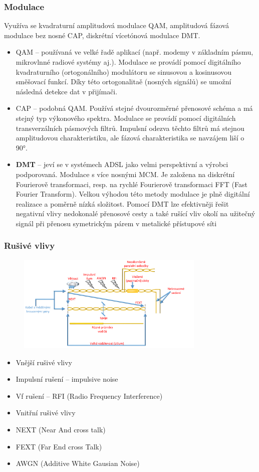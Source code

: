 \subsubsection{Modulace}
Využíva se kvadraturní amplitudová modulace QAM, amplitudová fázová modulace bez nosné CAP, diskrétní vícetónová modulace DMT.
\begin{itemize}
    \item QAM -- používaná ve velké řadě aplikací (např. modemy v základním pásmu, mikrovlnné radiové systémy aj.). Modulace se provádí pomocí digitálního kvadraturního (ortogonálního) modulátoru se sinusovou a kosinusovou směšovací funkcí. Díky této ortogonalitaě (nosných signálů) se umožní následná detekce dat v přijímači.
    \item CAP -- podobná QAM. Používá stejné dvourozměrné přenosové schéma a má stejný typ výkonového spektra. Modulace se provádí pomocí digitálních transverzálních pásmových filtrů. Impulsní odezva těchto filtrů má stejnou amplitudovou charakteristiku, ale fázová charakteristika se navzájem liší o 90°. 
    \item \textbf{DMT} -- jeví se v systémech ADSL jako velmi perspektivní a výrobci podporovaná. Modulace s více nosnými MCM. Je založena na diskrétní Fourierově transformaci, resp. na rychlé Fourierově transformaci FFT (Fast Fourier Transform). Velkou výhodou této metody modulace je plně digitální realizace a poměrně nízká složitost. Pomocí DMT lze efektivněji řešit negativní vlivy nedokonalé přenosové cesty a také rušící vliv okolí na užitečný signál při přenosu symetrickým párem v metalické přístupové síti
\end{itemize}

\subsubsection{Rušivé vlivy}
\begin{figure} [h]
    \centering
    \includegraphics[width=0.8\textwidth]{snimky/ADSL ruch.png}
    \label{fig:uml}
\end{figure}
\begin{itemize}
    \item Vnější rušivé vlivy
    \item Impulsní rušení – impulsive noise
    \item Vf rušení – RFI (Radio Frequency Interference)
    \item Vnitřní rušivé vlivy
    \item NEXT (Near And cross talk)
    \item FEXT (Far End cross Talk)
    \item AWGN (Additive White Gausian Noise)
\end{itemize}

